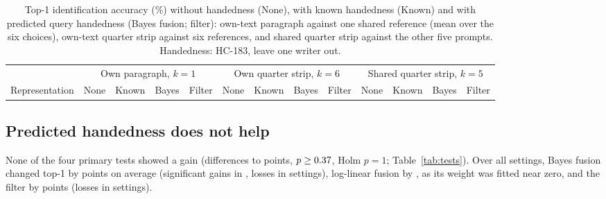 \documentclass[conference]{IEEEtran}
\begin{document}
\begin{table}[t]
\caption{Top-1 identification accuracy (\%) without handedness (None), with known handedness (Known) and with predicted query handedness (Bayes fusion; filter): own-text paragraph against one shared reference (mean over the six choices), own-text quarter strip against six references, and shared quarter strip against the other five prompts. Handedness: HC-183, leave one writer out.}
\label{tab:main}
\centering\footnotesize
\begin{tabular}{lcccccccccccc}
\toprule
 & \multicolumn{4}{c}{Own paragraph, $k=1$} & \multicolumn{4}{c}{Own quarter strip, $k=6$} & \multicolumn{4}{c}{Shared quarter strip, $k=5$} \\
\cmidrule(lr){2-5}\cmidrule(lr){6-9}\cmidrule(lr){10-13}
Representation & None & Known & Bayes & Filter & None & Known & Bayes & Filter & None & Known & Bayes & Filter \\
\midrule
\end{tabular}
\end{table}

\subsection{Predicted handedness does not help}
\label{sec:pred}
None of the four primary tests showed a gain (differences \vPrimDiffMin{} to \vPrimDiffMax{} points, $p\geq0.37$, Holm $p=1$; Table~\ref{tab:tests}). Over all settings, Bayes fusion changed top-1 by \vBayesGain{} points on average (significant gains in \vBayesSigUp{}, losses in \vBayesSigDown{} settings), log-linear fusion by \vLoglinGain{}, as its weight was fitted near zero, and the filter by \vFilterGain{} points (losses in \vFilterSigDown{} settings).

\begin{table}[t]
\caption{Primary tests: Bayes fusion of predicted query handedness against no fusion (top-1, \%). Diff.: writer-level mean difference (points) with writer-bootstrap interval; $p$: 9,999 sign flips; Holm over the four tests.}
\label{tab:tests}
\centering\scriptsize
\setlength{\tabcolsep}{1.8pt}
\end{table}
\end{document}

